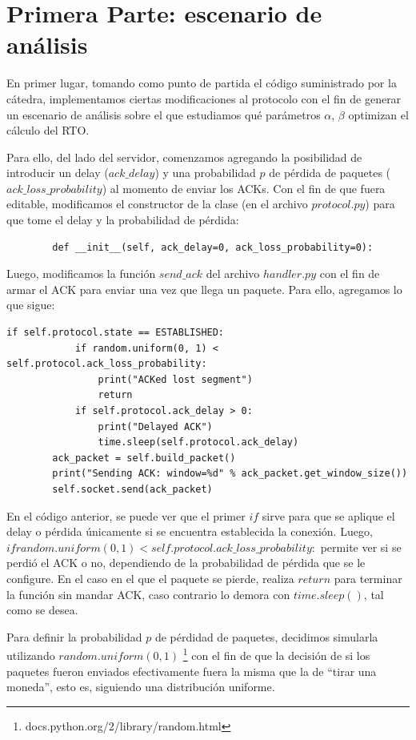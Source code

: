 \documentclass[10pt, a4paper]{article}
\begin{document}
\section{Primera Parte: escenario de análisis}

En primer lugar, tomando como punto de partida el código suministrado por la cátedra, implementamos ciertas modificaciones al protocolo con el fin de generar un escenario de análisis sobre el que estudiamos qué parámetros $\alpha$, $\beta$ optimizan el cálculo del RTO.

Para ello, del lado del servidor, comenzamos agregando la posibilidad de introducir un delay ($ack\_delay$) y una probabilidad $p$ de pérdida de paquetes ($ack\_loss\_probability$) al momento de enviar los ACKs. Con el fin de que fuera editable, modificamos el constructor de la clase (en el archivo $protocol.py$) para que tome el delay y la probabilidad de pérdida:
\begin{verbatim}
		def __init__(self, ack_delay=0, ack_loss_probability=0):
\end{verbatim}

Luego, modificamos la función $send\_ack$ del archivo $handler.py$ con el fin de armar el ACK para enviar una vez que llega un paquete. Para ello, agregamos lo que sigue:

\begin{verbatim}
if self.protocol.state == ESTABLISHED:
            if random.uniform(0, 1) < self.protocol.ack_loss_probability:
                print("ACKed lost segment")
                return
            if self.protocol.ack_delay > 0:
                print("Delayed ACK")
                time.sleep(self.protocol.ack_delay)
        ack_packet = self.build_packet()
        print("Sending ACK: window=%d" % ack_packet.get_window_size())
        self.socket.send(ack_packet)
\end{verbatim}
        
En el código anterior, se puede ver que el primer $if$ sirve para que se aplique el delay o pérdida únicamente si se encuentra establecida la conexión.
Luego, $if random.uniform(0, 1) < self.protocol.ack\_loss\_probability:$ permite ver si se perdió el ACK o no, dependiendo de la probabilidad de pérdida que se le configure. En el caso en el que el paquete se pierde, realiza $return$ para terminar la función sin mandar ACK, caso contrario lo demora con $time.sleep()$, tal como se desea.

Para definir la probabilidad $p$ de pérdidad de paquetes, decidimos simularla utilizando $random.uniform(0,1)$ \footnote{docs.python.org/2/library/random.html} con el fin de que la decisión de si los paquetes fueron enviados efectivamente fuera la misma que la de ``tirar una moneda'', esto es, siguiendo una distribución uniforme.
\end{document}
